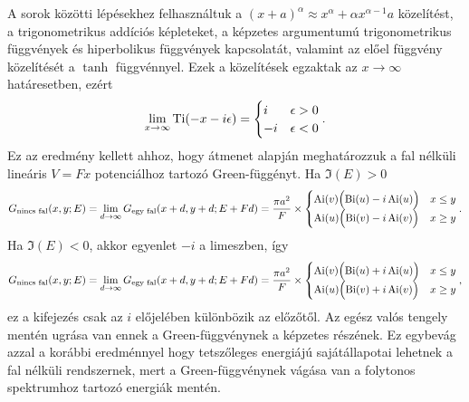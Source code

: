 A sorok közötti lépésekhez felhasználtuk a $(x+a)^\alpha\approx x^\alpha + \alpha x^{\alpha-1}a$ közelítést, a trigonometrikus addíciós képleteket, a képzetes argumentumú trigonometrikus függvények és hiperbolikus függvények kapcsolatát, valamint az előel függvény közelítését a $\tanh$ függvénnyel. Ezek a közelítések egzaktak az $x\to\infty$ határesetben, ezért
\begin{equation}
	\lim_{x\to\infty}\operatorname{Ti}(-x-i\epsilon)=
	\begin{cases}
		i &\epsilon > 0\\
		-i&\epsilon < 0
	\end{cases}.
	\label{limits:ti}
\end{equation}
Ez az eredmény kellett ahhoz, hogy  átmenet alapján meghatározzuk a fal nélküli lineáris $V=Fx$ potenciálhoz tartozó Green-függényt. Ha $\Im(E)>0$
\begin{dmath}
	G_{\text{nincs fal}}(x,y;E)=\lim_{d\to\infty}G_{\text{egy fal}}(x+d,y+d;E+Fd)=\frac{\pi a^2}{F}\times
	\begin{cases}
		\Ai(v)\Bigl(\Bi(u)-i\Ai(u)\Bigr)&x\leq y\\
		\Ai(u)\Bigl(\Bi(v)-i\Ai(v)\Bigr)&x\geq y
	\end{cases}.
	\label{limits:nowallgreen1}
\end{dmath}
Ha $\Im(E)<0$, akkor  egyenlet $-i$ a limeszben, így
\begin{dmath}
	G_{\text{nincs fal}}(x,y;E)=\lim_{d\to\infty}G_{\text{egy fal}}(x+d,y+d;E+Fd)=\frac{\pi a^2}{F}\times
	\begin{cases}
		\Ai(v)\Bigl(\Bi(u)+i\Ai(u)\Bigr)&x\leq y\\
		\Ai(u)\Bigl(\Bi(v)+i\Ai(v)\Bigr)&x\geq y
	\end{cases},
	\label{limits:nowallgreen2}
\end{dmath}
ez a kifejezés csak az $i$ előjelében különbözik az előzőtől. Az egész valós tengely mentén ugrása van ennek a Green-függvénynek a képzetes részének. Ez egybevág azzal a korábbi eredménnyel hogy tetszőleges energiájú sajátállapotai lehetnek a fal nélküli rendszernek, mert a Green-függvénynek vágása van a folytonos spektrumhoz tartozó energiák mentén.











